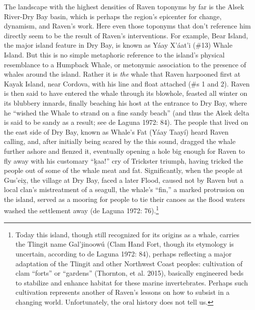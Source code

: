 The landscape with the highest densities of Raven toponyms by far is the Alsek River-Dry Bay basin, which is perhaps the region’s epicenter for change, dynamism, and Raven’s work.  Here even those toponyms that don’t reference him directly seem to be the result of Raven’s interventions. For example, Bear Island, the major island feature in Dry Bay, is known as Yáay X’áat’i (\#13) Whale Island.  But this is no simple metaphoric reference to the island’s physical resemblance to a Humpback Whale, or metonymic association to the presence of whales around the island.  Rather it is \textit{the} whale that Raven harpooned first at Kayak Island, near Cordova, with his line and float attached (\#s 1 and 2). Raven is then said to have entered the whale through its blowhole, feasted all winter on its blubbery innards, finally beaching his host at the entrance to Dry Bay, where he “wished the Whale to strand on a fine sandy beach” (and thus the Alsek delta is said to be sandy as a result; see de Laguna 1972: 84). The people that lived on the east side of Dry Bay, known as Whale’s Fat (Yáay Taayí) heard Raven calling, and, after initially being scared by the this sound, dragged the whale further ashore and flenzed it, eventually opening a hole big enough for Raven to fly away with his customary “k̲aa!” cry of Trickster triumph, having tricked the people out of some of the whale meat and fat.  Significantly, when the people at Gus'eix̲, the village at Dry Bay, faced a later Flood, caused not by Raven but a local clan’s mistreatment of a seagull, the whale’s “fin,” a marked protrusion on the island, served as a mooring for people to tie their canoes as the flood waters washed the settlement away (de Laguna 1972: 76).\footnote{Today this island, though still recognized for its origins as a whale, carries the Tlingit name Gal'jinoowú (Clam Hand Fort, though its etymology is uncertain, according to de Laguna 1972: 84), perhaps reflecting a major adaptation of the Tlingit and other Northwest Coast peoples: cultivation of clam “forts” or “gardens” (Thornton, et al. 2015), basically engineered beds to stabilize and enhance habitat for these marine invertebrates.  Perhaps such cultivation represents another of Raven’s lessons on how to subsist in a changing world.  Unfortunately, the oral history does not tell us.  }

